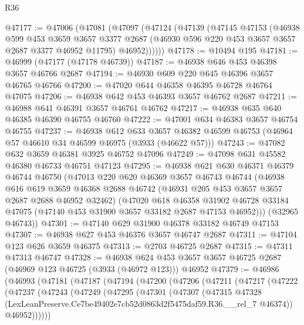 \begin{lexlean}{R36}
\begin{coremodule}
@47177 := @47006
    (@47081
      (@47097
        (@47124
          (@47139
            (@47145
              @47153
              (@46938
                @599
                @453
                @3659
                @3657
                @3377
                @2687
                (@46930 @596 @220 @453 @3657 @3657 @2687 @3377 @46952 @11795)
                @46952))))))
@47178 := @10494 @195
@47181 := @46999 (@47177 (@47178 @46739))
@47187 := @46938 @646 @453 @46398 @3657 @46766 @2687
@47194 := @46930 @609 @220 @645 @46396 @3657 @46765 @46766
@47200 := @47020 @644 @46358 @46395 @46728 @46764 @47075
@47206 := @46938 @642 @453 @46393 @3657 @46762 @2687
@47211 := @46988 @641 @46391 @3657 @46761 @46762
@47217 := @46938 @635 @640 @46385 @46390 @46755 @46760
@47222 := @47001 @634 @46383 @3657 @46754 @46755
@47237 := @46938
    @612
    @633
    @3657
    @46382
    @46599
    @46753
    (@46964 @57 @46610 @34 @46599 @46975 (@3933 (@46622 @57)))
@47243 := @47082 @632 @3659 @46381 @3925 @46752 @47096
@47249 := @47098 @631 @45582 @46380 @46733 @46751 @47123
@47295 := @46938
    @621
    @630
    @46371
    @46379
    @46744
    @46750
    (@47013
      @220
      @620
      @46369
      @3657
      @46743
      @46744
      (@46938
        @616
        @619
        @3659
        @46368
        @2688
        @46742
        (@46931 @205 @453 @3657 @3657 @2687 @2688 @46952 @32462)
        (@47020
          @618
          @46358
          @31902
          @46728
          @33184
          @47075
          (@47140 @453 @31900 @3657 @33182 @2687 @47153 @46952)))
      (@32965 @46743))
@47301 := @47140 @629 @31900 @46378 @33182 @46749 @47153
@47307 := @46938 @627 @453 @46376 @3657 @46747 @2687
@47311 := @47104 @123 @626 @3659 @46375
@47313 := @2703 @46725 @2687
@47315 := @47311 @47313 @46747
@47328 := @46938
    @624
    @453
    @3657
    @3657
    @46725
    @2687
    (@46969 @123 @46725 (@3933 (@46972 @123)))
    @46952
@47379 := @46986
    (@46993
      (@47181
        (@47187
          (@47194
            (@47200
              (@47206
                (@47211
                  (@47217
                    (@47222
                      (@47237
                        (@47243
                          (@47249
                            (@47295
                              (@47301
                                (@47307
                                  (@47315
                                    @47328
                                    (LexLeanPreserve.Ce7be49402e7cb52d0863d2f5475daf59.R36.__rel_7
                                      @46374))
                                  @46952))))))

\end{coremodule}
\end{lexlean}

